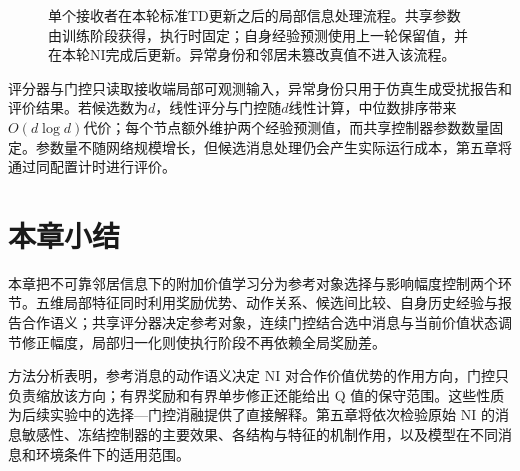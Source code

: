 \begin{figure}[!htbp]
\centering

\caption{单个接收者在本轮标准TD更新之后的局部信息处理流程。共享参数由训练阶段获得，执行时固定；自身经验预测使用上一轮保留值，并在本轮NI完成后更新。异常身份和邻居未篡改真值不进入该流程。}
\label{fig:w2-local-flow}
\par{}
\end{figure}

评分器与门控只读取接收端局部可观测输入，异常身份只用于仿真生成受扰报告和评价结果。若候选数为$d$，线性评分与门控随$d$线性计算，中位数排序带来$O(d\log d)$代价；每个节点额外维护两个经验预测值，而共享控制器参数数量固定。参数量不随网络规模增长，但候选消息处理仍会产生实际运行成本，第五章将通过同配置计时进行评价。

\section{本章小结}

本章把不可靠邻居信息下的附加价值学习分为参考对象选择与影响幅度控制两个环节。五维局部特征同时利用奖励优势、动作关系、候选间比较、自身历史经验与报告合作语义；共享评分器决定参考对象，连续门控结合选中消息与当前价值状态调节修正幅度，局部归一化则使执行阶段不再依赖全局奖励差。

方法分析表明，参考消息的动作语义决定 NI 对合作价值优势的作用方向，门控只负责缩放该方向；有界奖励和有界单步修正还能给出 Q 值的保守范围。这些性质为后续实验中的选择—门控消融提供了直接解释。第五章将依次检验原始 NI 的消息敏感性、冻结控制器的主要效果、各结构与特征的机制作用，以及模型在不同消息和环境条件下的适用范围。